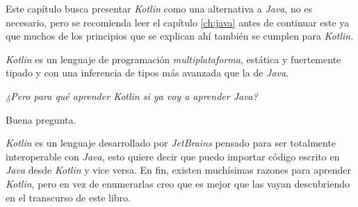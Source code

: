 Este capítulo busca presentar \textit{Kotlin} como una alternativa a \textit{Java}, no es
necesario, pero se recomienda leer el capítulo \ref{ch:java} antes de continuar este ya que
muchos de los principios que se explican ahí también se cumplen para \textit{Kotlin}.

\textit{Kotlin} es un lenguaje de programación \textit{multiplataforma}, estática y fuertemente
tipado y con una inferencia de tipos más avanzada que la de \textit{Java}.

\begin{center}
  \textit{¿Pero para qué aprender Kotlin si ya voy a aprender Java?}
\end{center}

Buena pregunta.
\vfill
\newpage

\textit{Kotlin} es un lenguaje desarrollado por \textit{JetBrains} pensado para ser totalmente 
interoperable con \textit{Java}, esto quiere decir que puedo importar código escrito en 
\textit{Java} desde \textit{Kotlin} y vice versa.
En fin, existen muchísimas razones para aprender \textit{Kotlin}, pero en vez de enumerarlas creo
que es mejor que las vayan descubriendo en el transcurso de este libro.